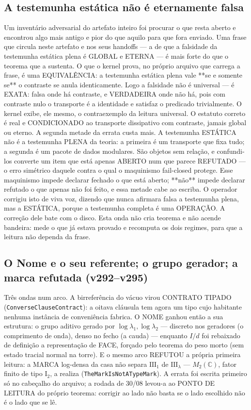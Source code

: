 \documentclass[11pt]{article}
\theoremstyle{definition}\newtheorem{deriv}{Derivação}
\begin{document}
\subsection*{A testemunha est\'atica n\~ao \'e eternamente falsa}Um invent\'ario adversarial do artefato inteiro foi procurar o que resta aberto e encontrou algo mais antigo e pior do que aquilo para que fora enviado. Uma frase que circula neste artefato e nos seus handoffs --- a de que a falsidade da testemunha est\'atica plena \'e GLOBAL e ETERNA --- \'e mais forte do que o teorema que a sustenta. O que o kernel prova, no pr\'oprio arquivo que carrega a frase, \'e uma EQUIVAL\^ENCIA: a testemunha est\'atica plena vale **se e somente se** o contraste se anula identicamente. Logo a falsidade n\~ao \'e universal --- \'e EXATA: falsa onde h\'a contraste, e VERDADEIRA onde n\~ao h\'a, pois com contraste nulo o transporte \'e a identidade e satisfaz o predicado trivialmente. O kernel exibe, ele mesmo, o contraexemplo da leitura universal. O estatuto correto \'e real e CONDICIONADO ao transporte dissipativo com contraste, jamais global ou eterno. A segunda metade da errata custa mais. A testemunha EST\'ATICA n\~ao \'e a testemunha PLENA da teoria: a primeira \'e um transporte que fixa tudo; a segunda \'e um pacote de dados modulares. S\~ao objetos sem rela\c{c}\~ao, e confundi-los converte um item que est\'a apenas ABERTO num que parece REFUTADO --- o erro sim\'etrico daquele contra o qual o maquinismo fail-closed protege. Esse maquinismo impede declarar fechado o que est\'a aberto; **n\~ao** impede declarar refutado o que apenas n\~ao foi feito, e essa metade cabe ao escriba. O operador corrigiu isto de viva voz, dizendo que nunca afirmara falsa a testemunha plena, mas a EST\'ATICA, porque a testemunha completa \'e uma OPERA\c{C}\~AO. A corre\c{c}\~ao dele bate com o disco. Esta onda n\~ao cria teorema e n\~ao acende bandeira: mede o que j\'a estava provado e recomputa os dois regimes, para que a leitura n\~ao dependa da frase.

\subsection*{O Nome e o seu referente; o grupo gerador; a marca refutada (v292--v295)}Tr\^es ondas num arco. A birrefer\^encia do v\'acuo virou CONTRATO TIPADO (\texttt{ConverseClauseContract}): a oitava cl\'ausula tem agora um tipo cujo habitante nenhuma inst\^ancia de conveni\^encia fabrica. O NOME ganhou ent\~ao a sua estrutura: o grupo aditivo gerado por $\log\lambda_1,\log\lambda_2$ --- discreto nos geradores (o comprimento de onda), denso no fecho (a cauda) --- enquanto $I/d$ foi rebaixado de defini\c{c}\~ao a representa\c{c}\~ao de FACE, for\c{c}ado pelo teorema do peso morto (sem estado tracial normal na torre). E o mesmo arco REFUTOU a pr\'opria primeira leitura: a MARCA log-densa da casa n\~ao separa $\mathrm{III}_1$ de $\mathrm{III}_\lambda$ --- $M_2(\mathbb{C})$, fator finito de tipo $\mathrm{I}_2$, a realiza (\texttt{TheMarkIsNotATypeMark}). A errata foi escrita primeiro s\'o no cabe\c{c}alho do arquivo; a rodada de 30/08 levou-a ao PONTO DE LEITURA do pr\'oprio teorema: corrigir ao lado n\~ao basta se o lado escolhido n\~ao \'e o lado que se l\^e.
\end{document}
